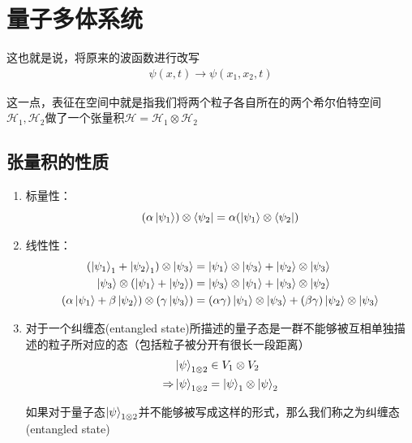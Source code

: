 \documentclass{article}
\begin{document}
\section{量子多体系统}
这也就是说，将原来的波函数进行改写
\begin{align*}
	\psi(x,t)\longrightarrow \psi(x_1,x_2,t)
\end{align*}

这一点，表征在空间中就是指我们将两个粒子各自所在的两个希尔伯特空间$\mathcal{H}_1,\mathcal{H}_2$做了一个张量积$\mathcal{H}=\mathcal{H}_1\otimes \mathcal{H}_2$


\subsection{张量积的性质}
\begin{enumerate}
	\item 标量性：\[(\alpha\ket{\psi_1})\otimes\bra{\psi_2}=\alpha(\ket{\psi_1}\otimes\bra{\psi_2})\]
	\item 线性性：
	      \begin{align*}
		      (\ket{\psi_1}_1+\ket{\psi_2}_1)\otimes \ket{\psi_3}                & =\ket{\psi_1}\otimes\ket{\psi_3}+\ket{\psi_2}\otimes\ket{\psi_3}                            \\
		      \ket{\psi_3}\otimes(\ket{\psi_1}+\ket{\psi_2})                     & =\ket{\psi_3}\otimes\ket{\psi_1}+\ket{\psi_3}\otimes\ket{\psi_2}                            \\
		      (\alpha\ket{\psi_1}+\beta\ket{\psi_2})\otimes (\gamma\ket{\psi_3}) & =(\alpha\gamma)\ket{\psi_1}\otimes\ket{\psi_3}+(\beta\gamma)\ket{\psi_2}\otimes\ket{\psi_3}
	      \end{align*}
	\item 对于一个纠缠态(entangled state)所描述的量子态是一群不能够被互相单独描述的粒子所对应的态（包括粒子被分开有很长一段距离）
	      \begin{align*}
		                  & \ket{\psi}_{1\otimes 2}\in V_1\otimes V_2               \\
		      \Rightarrow & \ket{\psi}_{1\otimes 2}=\ket{\psi}_1\otimes\ket{\psi}_2
	      \end{align*}

	      如果对于量子态$\ket{\psi}_{1\otimes 2}$并不能够被写成这样的形式，那么我们称之为纠缠态(entangled state)


\end{enumerate}
\end{document}
